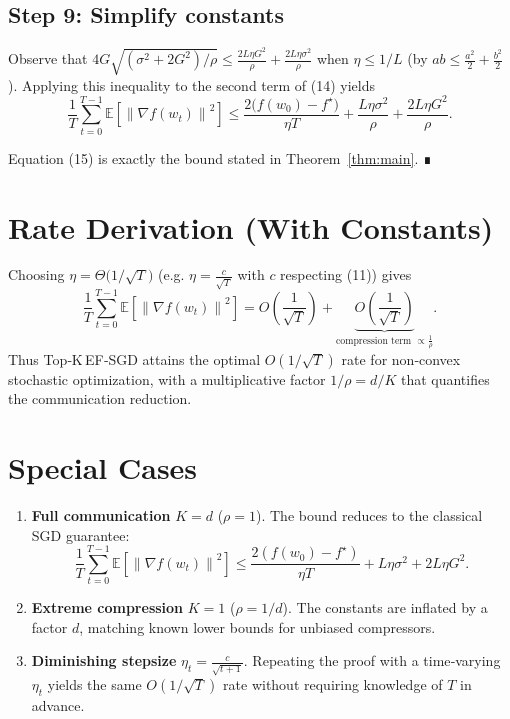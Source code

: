 \documentclass{article}
\newcommand{\EE}{\mathbb{E}}
\newcommand{\norm}[1]{\left\lVert #1 \right\rVert}
\begin{document}
\subsection*{Step 9: Simplify constants}
Observe that $4G\sqrt{(\sigma^{2}+2G^{2})/\rho}\le
\frac{2L\eta G^{2}}{\rho}+ \frac{2L\eta\sigma^{2}}{\rho}$ when $\eta\le 1/L$ (by $ab\le \tfrac{a^{2}}{2}+ \tfrac{b^{2}}{2}$). Applying this inequality to the second term of (14) yields
\[
\frac{1}{T}\sum_{t=0}^{T-1}\EE\!\left[\norm{\nabla f(w_t)}^{2}\right]
\le
\frac{2\bigl(f(w_0)-f^{\star}\bigr)}{\eta T}
+\frac{L\eta\sigma^{2}}{\rho}
+\frac{2L\eta G^{2}}{\rho}.
\tag{15}
\]

Equation (15) is exactly the bound stated in Theorem~\ref{thm:main}. ∎

\section*{Rate Derivation (With Constants)}
Choosing $\eta = \Theta\!\bigl(1/\sqrt{T}\bigr)$ (e.g. $\eta = \frac{c}{\sqrt{T}}$ with $c$ respecting (11)) gives
\[
\frac{1}{T}\sum_{t=0}^{T-1}\EE\!\left[\norm{\nabla f(w_t)}^{2}\right]
= O\!\left(\frac{1}{\sqrt{T}}\right)
+\underbrace{O\!\left(\frac{1}{\sqrt{T}}\right)}_{\text{compression term } \propto \tfrac{1}{\rho}}.
\]
Thus Top‑K EF‑SGD attains the optimal $O(1/\sqrt{T})$ rate for non‑convex stochastic optimization, with a multiplicative factor $1/\rho= d/K$ that quantifies the communication reduction.

\section*{Special Cases}
\begin{enumerate}[label=\alph*)]
    \item \textbf{Full communication} $K=d$ ($\rho=1$). The bound reduces to the classical SGD guarantee:
    \[
        \frac{1}{T}\sum_{t=0}^{T-1}\EE\!\left[\norm{\nabla f(w_t)}^{2}\right]
        \le\frac{2(f(w_0)-f^{\star})}{\eta T}+L\eta\sigma^{2}+2L\eta G^{2}.
    \]
    \item \textbf{Extreme compression} $K=1$ ($\rho=1/d$). The constants are inflated by a factor $d$, matching known lower bounds for unbiased compressors.
    \item \textbf{Diminishing stepsize} $\eta_t = \frac{c}{\sqrt{t+1}}$. Repeating the proof with a time‑varying $\eta_t$ yields the same $O(1/\sqrt{T})$ rate without requiring knowledge of $T$ in advance.
\end{enumerate}
\end{document}
